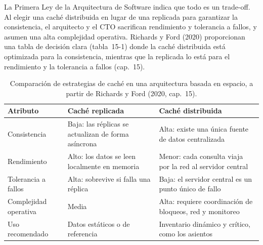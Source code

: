 \documentclass[12pt,a4paper]{article}
\begin{document}
La Primera Ley de la Arquitectura de Software indica que todo es un trade-off. Al elegir una caché distribuida en lugar de una replicada para garantizar la consistencia, el arquitecto y el CTO sacrifican rendimiento y tolerancia a fallos, y asumen una alta complejidad operativa. Richards y Ford (2020) proporcionan una tabla de decisión clara (tabla~15-1) donde la caché distribuida está optimizada para la consistencia, mientras que la replicada lo está para el rendimiento y la tolerancia a fallos (cap.~15).

\begin{table}[ht]
\centering
\footnotesize
\setlength{\tabcolsep}{5pt}
\begin{tabular}{|>{\raggedright\arraybackslash}p{3.1cm}|>{\raggedright\arraybackslash}p{4.6cm}|>{\raggedright\arraybackslash}p{4.6cm}|}
\hline
\textbf{Atributo} & \textbf{Caché replicada} & \textbf{Caché distribuida} \\
\hline
Consistencia & Baja: las réplicas se actualizan de forma asíncrona & Alta: existe una única fuente de datos centralizada \\
\hline
Rendimiento & Alto: los datos se leen localmente en memoria & Menor: cada consulta viaja por la red al servidor central \\
\hline
Tolerancia a fallos & Alta: sobrevive si falla una réplica & Baja: el servidor central es un punto único de fallo \\
\hline
Complejidad operativa & Media & Alta: requiere coordinación de bloqueos, red y monitoreo \\
\hline
Uso recomendado & Datos estáticos o de referencia & Inventario dinámico y crítico, como los asientos \\
\hline
\end{tabular}
\caption{Comparación de estrategias de caché en una arquitectura basada en espacio, a partir de Richards y Ford (2020, cap.~15).}
\label{tab:caches}
\end{table}
\end{document}
